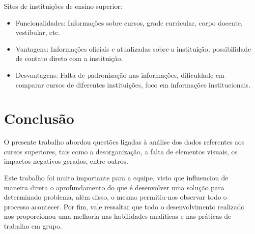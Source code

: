 \documentclass[a4paper,12pt]{article}
\begin{document}
Sites de instituições de ensino superior:
\begin{itemize}
    \item Funcionalidades: Informações sobre cursos, grade curricular, corpo docente, vestibular, etc.
    \item Vantagens: Informações oficiais e atualizadas sobre a instituição, possibilidade de contato direto com a instituição.
    \item Desvantagens: Falta de padronização nas informações, dificuldade em comparar cursos de diferentes instituições, foco em informações institucionais.
\end{itemize}

\section{Conclusão}
O presente trabalho abordou questões ligadas à análise dos dados referentes aos cursos superiores, tais como a desorganização, a falta de elementos visuais, os impactos negativos gerados, entre outros.

Este trabalho foi muito importante para a equipe, visto que influenciou de maneira direta o aprofundamento do que é desenvolver uma solução para determinado problema, além disso, o mesmo permitiu-nos observar todo o processo acontecer. Por fim, vale ressaltar que todo o desenvolvimento realizado nos proporcionou uma melhoria nas habilidades analíticas e nas práticas de trabalho em grupo.
\end{document}
